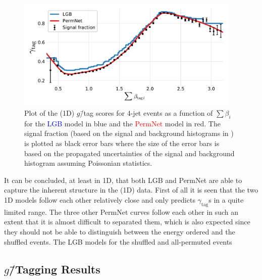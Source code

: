 \begin{figure}
  \centerfloat
  \includegraphics[width=0.95\textwidth, trim=10 10 10 20, clip]{figures/quarks/gtag_sum_models_njet=4-down_sample=1.00-ML_vars=vertex-selection=b-ejet_min=4-n_iter_RS_lgb=99-n_iter_RS_xgb=9-cdot_cut=0.90-version=19.pdf}
  \caption[1D Sum Models Predictions and Signal Fraction for 4-jets events]
          {Plot of the (1D) $g$\=/tag scores for 4-jet events as a function of $\sum \beta_i$ for the \textcolor{blue}{LGB} model in blue and the \textcolor{red}{PermNet} model in red. The signal fraction (based on the signal and background histograms in ) is plotted as black error bars where the size of the error bars is based on the propagated uncertainties of the signal and background histogram assuming Poissonian statistics. } 
  \label{fig:q:1d_sum_models_signal_fraction_4j}
\end{figure}

It can be concluded, at least in 1D, that both LGB and PermNet are able to capture the inherent structure in the (1D) data. First of all it is seen that the two 1D models follow each other relatively close and only predicts $\gamma_\mathrm{tag}$s in a quite limited range. The three other PermNet curves follow each other in such an extent that it is almost difficult to separated them, which is also expected since they should not be able to distinguish between the energy ordered and the shuffled events. The LGB models for the shuffled and all-permuted events 

\subsection{$g$\=/Tagging Results}

